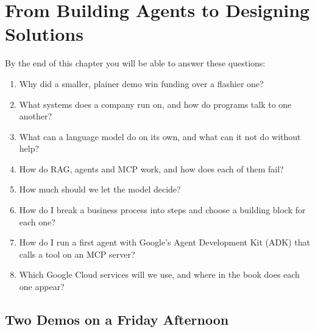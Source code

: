 
\chapter{From Building Agents to Designing Solutions}
\label{ch:foundations}

\begin{chapterquestions}
By the end of this chapter you will be able to answer these questions:
\begin{enumerate}[leftmargin=*,itemsep=2pt]
  \item Why did a smaller, plainer demo win funding over a flashier one?
  \item What systems does a company run on, and how do programs talk to one another?
  \item What can a language model do on its own, and what can it not do without help?
  \item How do RAG, agents and MCP work, and how does each of them fail?
  \item How much should we let the model decide?
  \item How do I break a business process into steps and choose a building block for each one?
  \item How do I run a first agent with Google's Agent Development Kit (ADK) that calls a tool on an MCP server?
  \item Which Google Cloud services will we use, and where in the book does each one appear?
\end{enumerate}
\end{chapterquestions}

\section{Two Demos on a Friday Afternoon}
\label{sec:two-demos}

